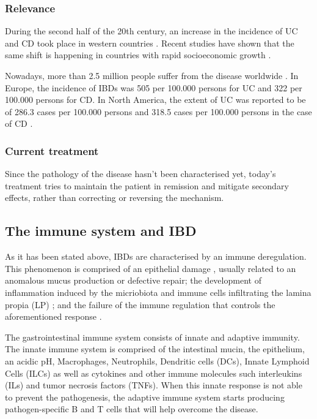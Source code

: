 \documentclass[../main.tex]{subfiles}
\begin{document}
\subsubsection{Relevance}

 During the second half of the 20th century, an increase in the incidence of UC and CD took place in western countries \citep{molodecky_increasing_2012}. Recent studies have shown that the same shift is happening in countries with rapid socioeconomic growth \citep{kaplan_globalisation_2016}.
 
 Nowadays, more than 2.5 million people suffer from the disease worldwide \citep{burisch_burden_2013}. In Europe, the incidence of IBDs was 505 per 100.000 persons for UC and 322 per 100.000 persons for CD. In North America, the extent of UC was reported to be of 286.3 cases per 100.000 persons and 318.5 cases per 100.000 persons in the case of CD \citep{ng_worldwide_2017}.

\subsubsection{Current treatment}
Since the pathology of the disease hasn't been characterised yet, today's treatment tries to maintain the patient in
remission and mitigate secondary effects, rather than correcting or reversing the mechanism. 


\subsection{The immune system and IBD}

As it has been stated above, IBDs are characterised by an immune deregulation. This phenomenon is comprised of an epithelial damage \citep{korzenik_evolving_2006}, usually related to an anomalous mucus production or defective repair; the development of inflammation induced by the micriobiota and immune cells infiltrating the lamina propia (LP) \citep{choy_overview_2017}; and the failure of the immune regulation that controls the aforementioned response \citep{ince_immunologic_2007}. 

The gastrointestinal immune system consists of innate and adaptive immunity. The innate immune system is comprised of the intestinal mucin, the epithelium, an acidic pH, Macrophages, Neutrophils, Dendritic cells (DCs), Innate Lymphoid Cells (ILCs) as well as cytokines and other immune molecules such interleukins (ILs) and tumor necrosis factors (TNFs). When this innate response is not able to prevent the pathogenesis, the adaptive immune system starts producing pathogen-specific B and T cells that will help overcome the disease.
\end{document}
